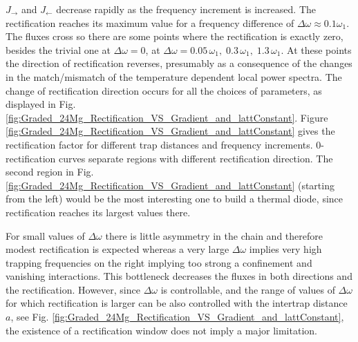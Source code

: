 $J_\rightarrow$ and $J_\leftarrow$
decrease rapidly as the frequency increment  is increased.
The rectification reaches its maximum value for a frequency difference of $\Delta\omega \approx 0.1 \omega_1$. The fluxes cross so there are some points where the rectification is exactly zero, besides the trivial one at $\Delta\omega = 0$, at $\Delta\omega = 0.05\,\omega_1,\;0.3\,\omega_1,\;1.3\,\omega_1$. At these points the direction of rectification reverses, presumably as a consequence of the changes in the match/mismatch of the temperature dependent local power spectra.
The change of rectification direction occurs for all the choices of parameters, as displayed in Fig. \ref{fig:Graded_24Mg_Rectification_VS_Gradient_and_lattConstant}. Figure \ref{fig:Graded_24Mg_Rectification_VS_Gradient_and_lattConstant} gives the rectification factor for different trap distances and frequency increments.  $0$-rectification curves separate regions with different rectification direction. The second region in Fig. \ref{fig:Graded_24Mg_Rectification_VS_Gradient_and_lattConstant} (starting from the left) would be the most interesting one to build a thermal diode, since rectification reaches its largest values there.

{For small values of $\Delta \omega$ there is little asymmetry in the chain and therefore modest rectification is expected whereas a very large $\Delta \omega$ implies very high trapping frequencies on the right implying too strong a
confinement and vanishing interactions. This bottleneck decreases the fluxes in both directions and  the rectification. However, since $\Delta \omega$ is controllable,
and the range of values of $\Delta \omega$ for which rectification is larger can be also controlled with the intertrap distance $a$, see Fig. \ref{fig:Graded_24Mg_Rectification_VS_Gradient_and_lattConstant},
the existence of a rectification window
does not imply a major limitation.}

